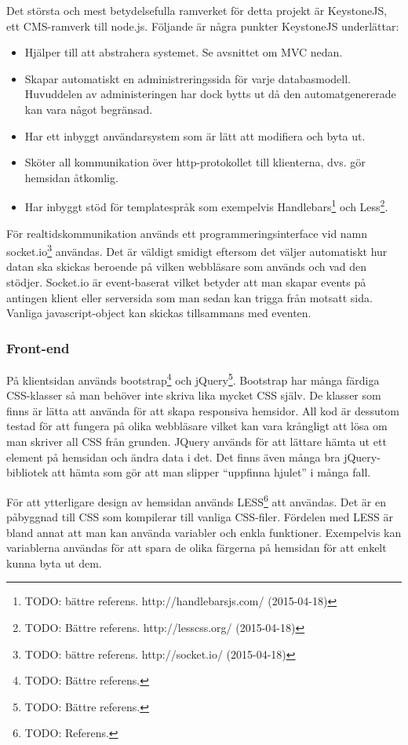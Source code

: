 Det största och mest betydelsefulla ramverket för detta projekt är KeystoneJS, ett CMS-ramverk till node.js.
Följande är några punkter KeystoneJS underlättar:
\begin{itemize}
  \item Hjälper till att abstrahera systemet. Se avsnittet om MVC nedan.
  \item Skapar automatiskt en administreringssida för varje databasmodell.
    Huvuddelen av administeringen har dock bytts ut då den automatgenererade kan vara något begränsad.
  \item Har ett inbyggt användarsystem som är lätt att modifiera och byta ut.
  \item Sköter all kommunikation över http-protokollet till klienterna, dvs. gör hemsidan åtkomlig.
  \item Har inbyggt stöd för templatespråk som exempelvis Handlebars\footnote{TODO: bättre referens. http://handlebarsjs.com/ (2015-04-18)} och Less\footnote{TODO: Bättre referens. http://lesscss.org/ (2015-04-18)}.
\end{itemize}

För realtidskommunikation används ett programmeringsinterface vid namn socket.io\footnote{TODO: bättre referens. http://socket.io/ (2015-04-18)} användas.
Det är väldigt smidigt eftersom det väljer automatiskt hur datan ska skickas beroende på vilken webbläsare som används och vad den stödjer.
Socket.io är event-baserat vilket betyder att man skapar events på antingen klient eller serversida som man sedan kan trigga från motsatt sida.
Vanliga javascript-object kan skickas tillsammans med eventen.

\subsubsection{Front-end}
På klientsidan används bootstrap\footnote{TODO: Bättre referens.} och jQuery\footnote{TODO: Bättre referens.}.
Bootstrap har många färdiga CSS-klasser så man behöver inte skriva lika mycket CSS själv.
De klasser som finns är lätta att använda för att skapa responsiva hemsidor.
All kod är dessutom testad för att fungera på olika webbläsare vilket kan vara krångligt att lösa om man skriver all CSS från grunden.
JQuery används för att lättare hämta ut ett element på hemsidan och ändra data i det.
Det finns även många bra jQuery-bibliotek att hämta som gör att man slipper “uppfinna hjulet” i många fall.

För att ytterligare design av hemsidan används LESS\footnote{TODO: Referens.} att användas.
Det är en påbyggnad till CSS som kompilerar till vanliga CSS-filer.
Fördelen med LESS är bland annat att man kan använda variabler och enkla funktioner.
Exempelvis kan variablerna användas för att spara de olika färgerna på hemsidan för att enkelt kunna byta ut dem.


